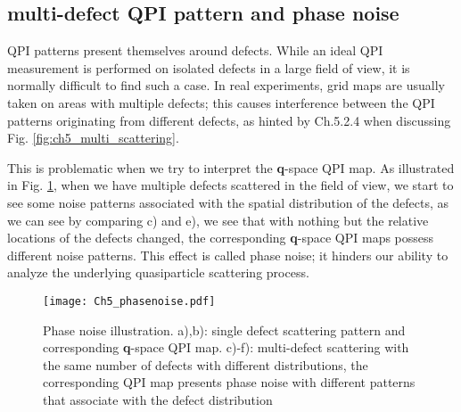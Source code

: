 \subsection{multi-defect QPI pattern and phase noise}
\ac{QPI} patterns present themselves around defects. While an ideal \ac{QPI} measurement is performed on isolated defects in a large field of view, it is normally difficult to find such a case. In real experiments, grid maps are usually taken on areas with multiple defects; this causes interference between the \ac{QPI} patterns originating from different defects, as hinted by Ch.5.2.4 when discussing Fig. \ref{fig:ch5_multi_scattering}.

This is problematic when we try to interpret the \textbf{q}-space \ac{QPI} map. As illustrated in Fig. \ref{fig:ch5_phasenoise}, when we have multiple defects scattered in the field of view, we start to see some noise patterns associated with the spatial distribution of the defects, as we can see by comparing c) and e), we see that with nothing but the relative locations of the defects changed, the corresponding \textbf{q}-space \ac{QPI} maps possess different noise patterns. This effect is called phase noise; it hinders our ability to analyze the underlying quasiparticle scattering process. 

\begin{figure}
	\texttt{[image: Ch5\_phasenoise.pdf]} 
	\centering
	\caption{Phase noise illustration. a),b): single defect scattering pattern and corresponding \textbf{q}-space QPI map. c)-f): multi-defect scattering with the same number of defects with different distributions, the corresponding QPI map presents phase noise with different patterns that associate with the defect distribution}
	\label{fig:ch5_phasenoise}
\end{figure}


